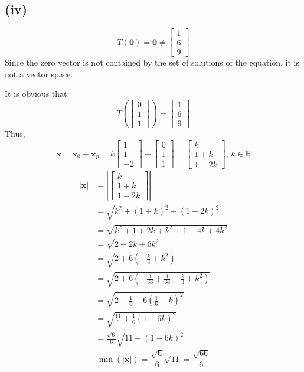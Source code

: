 \documentclass[a4paper]{article}
\newcommand{\vv}{\mathbf}
\begin{document}
\subsection*{(iv)}
\[T(\vv0)=\vv0\ne\begin{bmatrix}1\\6\\9\end{bmatrix}\]
Since the zero vector is not contained by the set of solutions of the equation, it is not a vector space.

It is obvious that:
\[T\left(\begin{bmatrix}0\\1\\1\end{bmatrix}\right)=\begin{bmatrix}1\\6\\9\end{bmatrix}\]
Thus,
\[\vv x=\vv x_0+\vv x_p=k\begin{bmatrix}1\\1\\-2\end{bmatrix}+\begin{bmatrix}0\\1\\1\end{bmatrix}=\begin{bmatrix}k\\1+k\\1-2k\end{bmatrix},\,k\in\mathbb R\]
\[\begin{aligned}
	|\vv x|&=\left|\begin{bmatrix}k\\1+k\\1-2k\end{bmatrix}\right|\\
	       &=\sqrt{k^2+(1+k)^2+(1-2k)^2}\\
	       &=\sqrt{k^2+1+2k+k^2+1-4k+4k^2}\\
	       &=\sqrt{2-2k+6k^2}\\
	       &=\sqrt{2+6\left(-\frac k3+k^2\right)}\\
	       &=\sqrt{2+6\left(-\frac1{36}+\frac1{36}-\frac k3+k^2\right)}\\
	       &=\sqrt{2-\frac16+6\left(\frac16-k\right)^2}\\
	       &=\sqrt{\frac{11}6+\frac16\left(1-6k\right)^2}\\
	       &=\frac{\sqrt{6}}{6}\sqrt{11+\left(1-6k\right)^2}
\end{aligned}\]
\[\min(|\vv x|)=\frac{\sqrt6}6\sqrt{11}=\boxed{\frac{\sqrt{66}}6}\]
\end{document}
